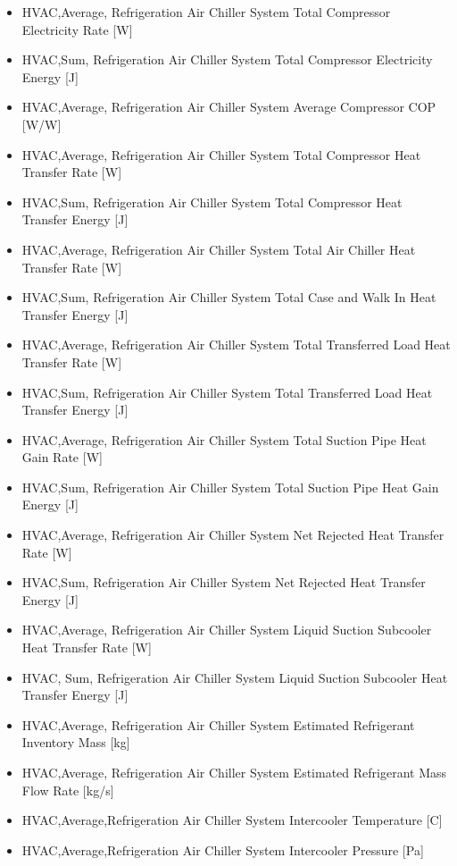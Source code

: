 \begin{itemize}
\item
  HVAC,Average, Refrigeration Air Chiller System Total Compressor Electricity Rate {[}W{]}
\item
  HVAC,Sum, Refrigeration Air Chiller System Total Compressor Electricity Energy {[}J{]}
\item
  HVAC,Average, Refrigeration Air Chiller System Average Compressor COP {[}W/W{]}
\item
  HVAC,Average, Refrigeration Air Chiller System Total Compressor Heat Transfer Rate {[}W{]}
\item
  HVAC,Sum, Refrigeration Air Chiller System Total Compressor Heat Transfer Energy {[}J{]}
\item
  HVAC,Average, Refrigeration Air Chiller System Total Air Chiller Heat Transfer Rate {[}W{]}
\item
  HVAC,Sum, Refrigeration Air Chiller System Total Case and Walk In Heat Transfer Energy {[}J{]}
\item
  HVAC,Average, Refrigeration Air Chiller System Total Transferred Load Heat Transfer Rate {[}W{]}
\item
  HVAC,Sum, Refrigeration Air Chiller System Total Transferred Load Heat Transfer Energy {[}J{]}
\item
  HVAC,Average, Refrigeration Air Chiller System Total Suction Pipe Heat Gain Rate {[}W{]}
\item
  HVAC,Sum, Refrigeration Air Chiller System Total Suction Pipe Heat Gain Energy {[}J{]}
\item
  HVAC,Average, Refrigeration Air Chiller System Net Rejected Heat Transfer Rate {[}W{]}
\item
  HVAC,Sum, Refrigeration Air Chiller System Net Rejected Heat Transfer Energy {[}J{]}
\item
  HVAC,Average, Refrigeration Air Chiller System Liquid Suction Subcooler Heat Transfer Rate {[}W{]}
\item
  HVAC, Sum, Refrigeration Air Chiller System Liquid Suction Subcooler Heat Transfer Energy {[}J{]}
\item
  HVAC,Average, Refrigeration Air Chiller System Estimated Refrigerant Inventory Mass {[}kg{]}
\item
  HVAC,Average, Refrigeration Air Chiller System Estimated Refrigerant Mass Flow Rate {[}kg/s{]}
\item
  HVAC,Average,Refrigeration Air Chiller System Intercooler Temperature {[}C{]}
\item
  HVAC,Average,Refrigeration Air Chiller System Intercooler Pressure {[}Pa{]}

\end{itemize}
